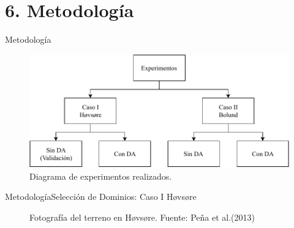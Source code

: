 \documentclass[mathserif,10pt]{beamer}
\begin{document}
\section{6. Metodología}
\begin{frame}{Metodología}
	\begin{figure}[h!]
		\centering
		\includegraphics[width=1\linewidth,clip]{tesis_experimentos}%
		\caption{Diagrama de experimentos realizados.}
	\end{figure}
\end{frame}
\begin{frame}{Metodología}{Selección de Dominios: Caso I Høvsøre}
	 \begin{figure}[H]
	 	\centering{}%
	 	\caption{Fotografía del terreno en Høvsøre. Fuente: Peña et al.(2013)}
	 	\label{fig:05_terreno_hovsore}
	 \end{figure}
\end{frame}
\end{document}
